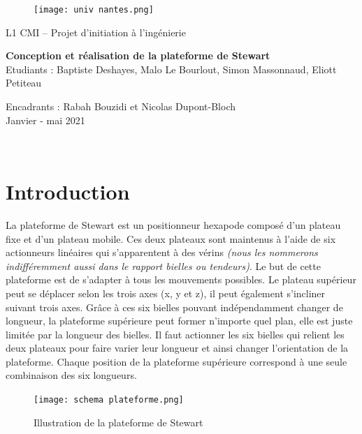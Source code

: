 \documentclass[a4paper,12pt]{article}
\begin{document}
%
%
\begin{figure}[H]
  \centering
  \texttt{[image: univ nantes.png]}
\end{figure}

\begin{center}
	{\large {L1 CMI -- Projet d'initiation à l'ingénierie}} \\
	\vspace{6cm}
  {\Large \textbf{Conception et réalisation de la plateforme de Stewart} \\
	\vspace{2mm}
	Etudiants : Baptiste Deshayes, Malo Le Bourlout, Simon Massonnaud, Eliott Petiteau

    Encadrants : Rabah Bouzidi et  Nicolas Dupont-Bloch\\
	\vspace{9cm}	
	Janvier - mai 2021} \\
	\vspace{3mm}
	
\end{center}

\newpage

\tableofcontents

\newpage
%
%
\section{Introduction}

La plateforme de Stewart est un positionneur hexapode composé d’un plateau fixe et d’un plateau mobile. 
Ces deux plateaux sont maintenus à l’aide de six actionneurs linéaires qui s’apparentent à des vérins \textit{(nous les nommerons indifféremment aussi dans le rapport bielles ou tendeurs)}. Le but de cette plateforme est de s'adapter à tous les mouvements possibles.
Le plateau supérieur peut se déplacer selon les trois axes (x, y et z), il peut également s’incliner suivant trois axes. 
Grâce à ces six bielles pouvant indépendamment changer de longueur, la plateforme supérieure peut former n’importe quel plan, elle est juste limitée par la longueur des bielles. 
Il faut actionner les six bielles qui relient les deux plateaux pour faire varier leur longueur et ainsi changer l’orientation de la plateforme. 
Chaque position de la plateforme supérieure correspond à une seule combinaison des six longueurs.


\begin{figure}[H]
  \centering
  \texttt{[image: schema plateforme.png]}
  \caption{Illustration de la plateforme de Stewart}
\end{figure}
\end{document}
